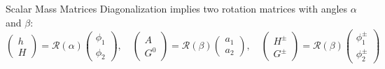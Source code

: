 \documentclass{../bredelebeamer}
\begin{document}
\begin{frame}{Scalar Mass Matrices}
     Diagonalization implies two rotation matrices with angles $\alpha$ and $\beta$:
    {\small
    \begin{equation*}
        \begin{pmatrix}
            h \\ H
        \end{pmatrix}
        =\mathcal{R}(\alpha)
        \begin{pmatrix}
            \phi_1 \\ \phi_2
        \end{pmatrix},
        \quad
        \begin{pmatrix}
            A \\ G^0
        \end{pmatrix}
        =\mathcal{R}(\beta)
        \begin{pmatrix}
            a_1 \\ a_2
        \end{pmatrix},
        \quad
        \begin{pmatrix}
            H^\pm \\ G^\pm
        \end{pmatrix}
        =\mathcal{R}(\beta)
        \begin{pmatrix}
            \phi_1^\pm \\ \phi_2^\pm
        \end{pmatrix}
    \end{equation*}
    }

\end{frame}
\end{document}
